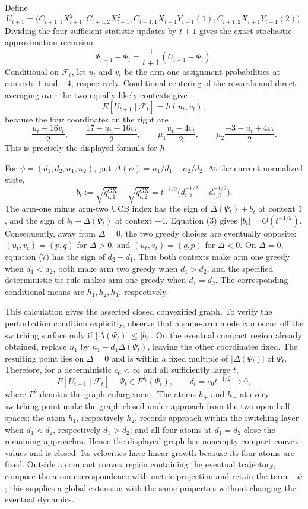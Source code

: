 Define
\[
 U_{t+1}=\bigl(C_{t+1,1}X_{t+1}^2,C_{t+1,2}X_{t+1}^2,
 C_{t+1,1}X_{t+1}Y_{t+1}(1),C_{t+1,2}X_{t+1}Y_{t+1}(2)\bigr).
\]
Dividing the four sufficient-statistic updates by \(t+1\) gives the exact stochastic-approximation recursion
\[
 \Psi_{t+1}-\Psi_t=\frac1{t+1}(U_{t+1}-\Psi_t). \tag{5}
\]
Conditional on \(\mathcal F_t\), let \(u_t\) and \(v_t\) be the arm-one assignment probabilities at contexts \(1\) and \(-4\), respectively.  Conditional centering of the rewards and direct averaging over the two equally likely contexts give
\[
 E[U_{t+1}\mid\mathcal F_t]=h(u_t,v_t), \tag{6}
\]
because the four coordinates on the right are
\[
 \frac{u_t+16v_t}{2},\qquad \frac{17-u_t-16v_t}{2},\qquad
 \mu_1\frac{u_t-4v_t}{2},\qquad
 \mu_2\frac{-3-u_t+4v_t}{2}.
\]
This is precisely the displayed formula for \(h\).

For \(\psi=(d_1,d_2,n_1,n_2)\), put \(\Delta(\psi)=n_1/d_1-n_2/d_2\).  At the current normalized state,
\[
 b_t:=\sqrt{q^{\mathrm{GX}}_{t,1}}-\sqrt{q^{\mathrm{GX}}_{t,2}}
 =t^{-1/2}\bigl(d_{t,1}^{-1/2}-d_{t,2}^{-1/2}\bigr). \tag{7}
\]
The arm-one minus arm-two UCB index has the sign of \(\Delta(\Psi_t)+b_t\) at context \(1\), and the sign of \(b_t-\Delta(\Psi_t)\) at context \(-4\).  Equation (3) gives \(|b_t|=O(t^{-1/2})\).  Consequently, away from \(\Delta=0\), the two greedy choices are eventually opposite: \((u_t,v_t)=(p,q)\) for \(\Delta>0\), and \((u_t,v_t)=(q,p)\) for \(\Delta<0\).  On \(\Delta=0\), equation (7) has the sign of \(d_2-d_1\).  Thus both contexts make arm one greedy when \(d_1<d_2\), both make arm two greedy when \(d_1>d_2\), and the specified deterministic tie rule makes arm one greedy when \(d_1=d_2\).  The corresponding conditional means are \(h_1,h_2,h_1\), respectively.

This calculation gives the asserted closed convexified graph.  To verify the perturbation condition explicitly, observe that a same-arm mode can occur off the switching surface only if \(|\Delta(\Psi_t)|\leq |b_t|\).  On the eventual compact region already obtained, replace \(n_1\) by \(n_1-d_1\Delta(\Psi_t)\), leaving the other coordinates fixed.  The resulting point lies on \(\Delta=0\) and is within a fixed multiple of \(|\Delta(\Psi_t)|\) of \(\Psi_t\).  Therefore, for a deterministic \(c_0<\infty\) and all sufficiently large \(t\),
\[
 E[U_{t+1}\mid\mathcal F_t]-\Psi_t\in F^{\delta_t}(\Psi_t),
 \qquad \delta_t=c_0t^{-1/2}\longrightarrow0, \tag{8}
\]
where \(F^\delta\) denotes the graph enlargement.  The atoms \(h_+\) and \(h_-\) at every switching point make the graph closed under approach from the two open half-spaces; the atom \(h_1\), respectively \(h_2\), records approach within the switching layer when \(d_1<d_2\), respectively \(d_1>d_2\); and all four atoms at \(d_1=d_2\) close the remaining approaches.  Hence the displayed graph has nonempty compact convex values and is closed.  Its velocities have linear growth because its four atoms are fixed.  Outside a compact convex region containing the eventual trajectory, compose the atom correspondence with metric projection and retain the term \(-\psi\); this supplies a global extension with the same properties without changing the eventual dynamics.


